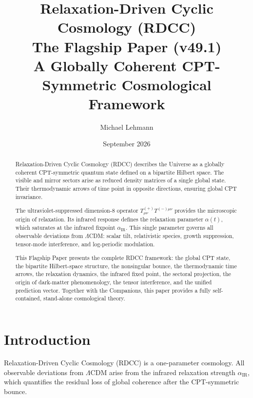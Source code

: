 \documentclass[11pt,a4paper]{article}
\title{\textbf{Relaxation-Driven Cyclic Cosmology (RDCC)}\\[0.2cm]
\textbf{The Flagship Paper (v49.1)}\\[0.2cm]
\large A Globally Coherent CPT-Symmetric Cosmological Framework}
\author[1]{Michael Lehmann}
\affil[1]{\small Independent Researcher, Relaxation-Driven Cyclic Cosmology (RDCC)\\
\texttt{mi.lehmann@gmx.de}}
\date{September 2026}
\begin{document}
\maketitle


\begin{abstract}
Relaxation-Driven Cyclic Cosmology (RDCC) describes the Universe as a globally
coherent CPT-symmetric quantum state defined on a bipartite Hilbert space.
The visible and mirror sectors arise as reduced density matrices of a single
global state. Their thermodynamic arrows of time point in opposite directions,
ensuring global CPT invariance.

The ultraviolet-suppressed dimension-8 operator $T^{(+)}_{\mu\nu}T^{(-)\mu\nu}$
provides the microscopic origin of relaxation. Its infrared response defines the
relaxation parameter $\alpha(t)$, which saturates at the infrared fixpoint
$\alpha_{\mathrm{IR}}$. This single parameter governs all observable deviations
from $\Lambda$CDM: scalar tilt, relativistic species, growth suppression,
tensor-mode interference, and log-periodic modulation.

This Flagship Paper presents the complete RDCC framework: the global CPT state,
the bipartite Hilbert-space structure, the nonsingular bounce, the thermodynamic
time arrows, the relaxation dynamics, the infrared fixed point, the sectoral
projection, the origin of dark-matter phenomenology, the tensor interference,
and the unified prediction vector. Together with the Companions, this paper
provides a fully self-contained, stand-alone cosmological theory.
\end{abstract}

\tableofcontents
\newpage

\section{Introduction}

Relaxation-Driven Cyclic Cosmology (RDCC) is a one-parameter cosmology. All
observable deviations from $\Lambda$CDM arise from the infrared relaxation
strength $\alpha_{\mathrm{IR}}$, which quantifies the residual loss of global
coherence after the CPT-symmetric bounce.
\end{document}
